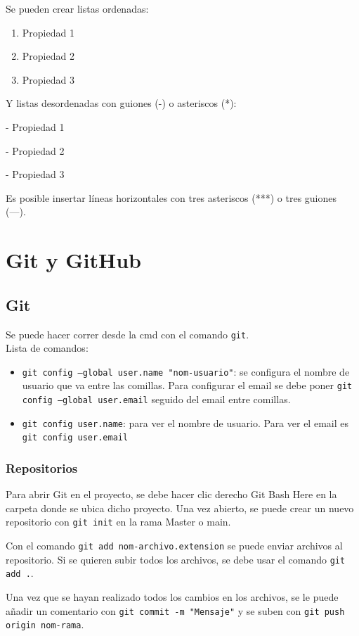 \documentclass[a4paper, 12pt]{book}
\begin{document}
Se pueden crear listas ordenadas:
\begin{enumerate}
	\item Propiedad 1
	\item Propiedad 2
	\item Propiedad 3
\end{enumerate}
Y listas desordenadas con guiones (-) o asteriscos (*):

- Propiedad 1

- Propiedad 2

- Propiedad 3


Es posible insertar líneas horizontales con tres asteriscos (***) o tres guiones (---).


%
\chapter{Git y GitHub}
\section{Git}
Se puede hacer correr desde la cmd con el comando \texttt{git}. \\
Lista de comandos:
\begin{itemize}
\item \texttt{git config --global user.name "nom-usuario"}: se configura el nombre de usuario que va entre las comillas. Para configurar el email se debe poner \texttt{git config --global user.email} seguido del email entre comillas.
\item \texttt{git config user.name}: para ver el nombre de usuario. Para ver el email es \texttt{git config user.email}
\end{itemize}
\subsection{Repositorios}
Para abrir Git en el proyecto, se debe hacer clic derecho Git Bash Here en la carpeta donde se ubica dicho proyecto. Una vez abierto, se puede crear un nuevo repositorio con \texttt{git init} en la rama Master o main.

Con el comando \texttt{git add nom-archivo.extension} se puede enviar archivos al repositorio. Si se quieren subir todos los archivos, se debe usar el comando \texttt{git add .}.

Una vez que se hayan realizado todos los cambios en los archivos, se le puede añadir un comentario con \texttt{git commit -m "Mensaje"} y se suben con \texttt{git push origin nom-rama}.
\end{document}
